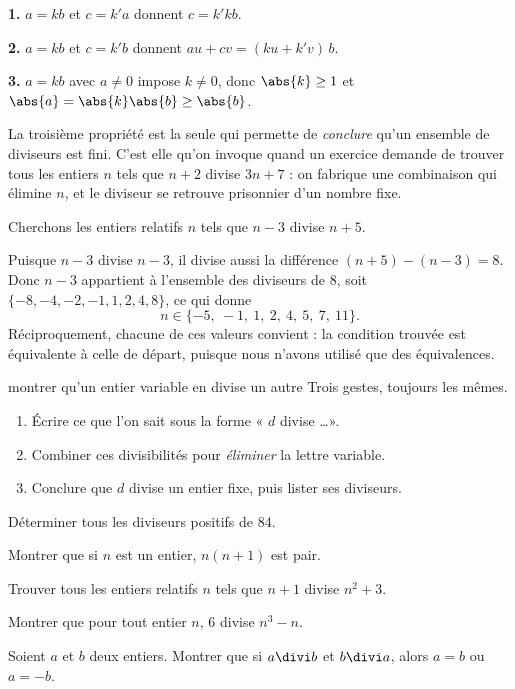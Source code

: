 \begin{demonstration}
\textbf{1.} $a = kb$ et $c = k'a$ donnent $c = k'kb$.

\textbf{2.} $a = kb$ et $c = k'b$ donnent $au+cv = (ku+k'v)\,b$.

\textbf{3.} $a = kb$ avec $a \neq 0$ impose $k \neq 0$, donc
$\abs{k} \geq 1$ et $\abs{a} = \abs{k}\abs{b} \geq \abs{b}$.
\end{demonstration}

\begin{avertissement}
La troisième propriété est la seule qui permette de \emph{conclure} qu'un
ensemble de diviseurs est fini. C'est elle qu'on invoque quand un exercice
demande de trouver tous les entiers $n$ tels que $n+2$ divise $3n+7$ : on
fabrique une combinaison qui élimine $n$, et le diviseur se retrouve
prisonnier d'un nombre fixe.
\end{avertissement}

\begin{exemple}
Cherchons les entiers relatifs $n$ tels que $n-3$ divise $n+5$.

Puisque $n-3$ divise $n-3$, il divise aussi la différence
$(n+5)-(n-3) = 8$. Donc $n-3$ appartient à l'ensemble des diviseurs de $8$,
soit $\{-8,-4,-2,-1,1,2,4,8\}$, ce qui donne
\[
  n \in \{-5,\ -1,\ 1,\ 2,\ 4,\ 5,\ 7,\ 11\}.
\]
Réciproquement, chacune de ces valeurs convient : la condition trouvée est
équivalente à celle de départ, puisque nous n'avons utilisé que des
équivalences.
\end{exemple}

\begin{methode}{montrer qu'un entier variable en divise un autre}
Trois gestes, toujours les mêmes.
\begin{enumerate}[label=\textbf{\arabic*.}, leftmargin=*, itemsep=0.15em]
  \item Écrire ce que l'on sait sous la forme « $d$ divise \dots ».
  \item Combiner ces divisibilités pour \emph{éliminer} la lettre variable.
  \item Conclure que $d$ divise un entier fixe, puis lister ses diviseurs.
\end{enumerate}
\end{methode}

\begin{entrainement}[divisibilité]
\exo[\niveau{1}] Déterminer tous les diviseurs positifs de $84$.

\exo[\niveau{1}] Montrer que si $n$ est un entier, $n(n+1)$ est pair.

\exo[\niveau{2}] Trouver tous les entiers relatifs $n$ tels que $n+1$ divise
$n^{2}+3$.

\exo[\niveau{2}] Montrer que pour tout entier $n$, $6$ divise
$n^{3}-n$.

\exo[\niveau{3}] Soient $a$ et $b$ deux entiers. Montrer que si $a \divi b$ et
$b \divi a$, alors $a = b$ ou $a = -b$.
\end{entrainement}

